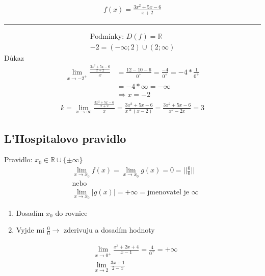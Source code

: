 \begin{center}
  \begin{align*}
    f(x)=\frac{3x^2+5x-6}{x+2}
  \end{align*}
  \hrule
  \begin{align*}
  \text{Podmínky: }
    D(f)=\mathbb{R}\\{-2}=(-\infty;2)\cup(2;\infty)
  \end{align*}
  Důkaz
  \begin{align*}
    \lim_{x \to -2^+}\frac{\frac{3x^2+5x-6}{x+2}}{x}
    &=\frac{12-10-6}{0^+}=\frac{-4}{0^+}=-4*\frac{1}{0^+}\\
    &=-4*\infty=-\infty \\
    &\Rightarrow x = -2 
  \end{align*}
  \begin{align*}
    k=\lim_{x \to \infty}\frac{\frac{3x^2+5x-6}{x+2}}{x}=\frac{3x^2+5x-6}{x*(x-2)}=\frac{3x^2+5x-6}{x^2-2x}=3
  \end{align*}
\end{center}

\subsection{L'Hospitalovo pravidlo}
\begin{center}
  Pravidlo: $x_0\in\mathbb{R}\cup\{\pm\infty\}$
  \begin{align*}
    &\lim_{x \to x_0}f(x)=\lim_{x \to x_0}g(x)=0=||\frac{0}{0}|| \\
    &\text{nebo}\\
    &\lim_{x \to x_0}|g(x)|=+\infty=\text{jmenovatel je $\infty$}
  \end{align*}
  \begin{enumerate}
    \item Dosadím $x_0$ do rovnice
    \item Vyjde mi $\frac{0}{0}\rightarrow$ zderivuju a dosadím hodnoty
  \end{enumerate}
  \begin{eqnarray*}
    &\lim_{x \to 0^+}\frac{x^2+2x+4}{x-1}=\frac{4}{0^+}=+\infty\\
    &\lim_{x \to 2}\frac{3x+1}{2-x}
  \end{eqnarray*}
\end{center}

